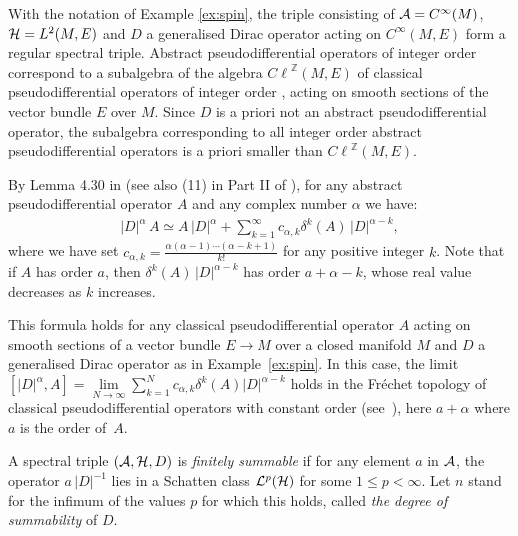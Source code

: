 \documentclass[11pt]{article}
\def \Z {\mathbb Z}
\def \Ci {{C^\infty}}
\def \Cl {{C\ell}}
\numberwithin{equation}{section}
\begin{document}
\begin{example} With the notation  of Example \ref{ex:spin}, the triple consisting of  ${\cal A}=\Ci(M)$,
  ${\cal H}= L^2(M, E)$ and $D$ a generalised Dirac operator acting on $\Ci(M,
  E)$ form a regular spectral triple. Abstract pseudodif\/ferential operators
 of integer order correspond to a subalgebra of the algebra $\Cl^\Z(M, E)$ of classical pseudodif\/ferential operators of integer
  order \cite{Ho, Sh,Ta,Tr}, acting on smooth sections of the vector bundle $E$ over $M$. Since
   $D$ is a priori not an abstract pseudo\-dif\/ferential operator, the subalgebra
  corresponding to all integer order abstract pseudodif\/ferential operators is a
  priori smaller than  $\Cl^\Z(M, E)$.
\end{example}

By Lemma
4.30 in \cite{Hig} (see also (11) in Part II of \cite{CoMo}), for any abstract
pseudodif\/ferential operator $A$ and any complex number $\alpha$  we have:
 \begin{gather} \label{eq:commDalpha} \vert D\vert^\alpha\,  A\simeq    A\,
 \vert D\vert^\alpha+  \sum_{k=1}^\infty c_{\alpha,k}
\delta^k(A) \, \vert D\vert^{\alpha -k},
\end{gather}
 where we have set $c_{ \alpha, k}=
 \frac{\alpha(\alpha-1)\cdots (\alpha-k+1)}{k!}$ for any positive integer $k$. Note that if $A$ has order
$a$,
 then  $\delta^k(A)\, \vert D\vert^{\alpha-k}$ has order $a+\alpha-k$,   whose
 real value  decreases as $k$ increases.
\begin{example}
This formula holds  for any classical pseudodif\/ferential
operator $A$ acting on smooth sections of a vector bundle $E\to M$ over a
closed manifold $M$  and $D$ a generalised Dirac operator as in Example~\ref{ex:spin}. In this case,   the
limit $[\vert D\vert^\alpha, A]= \lim\limits_{N\to \infty}  \sum\limits_{k=1}^N c_{\alpha,k}
\delta^k(A)   \vert D\vert^{\alpha -k}$  holds in the Fr\'echet topology  of
classical pseudodif\/ferential operators with constant order (see~\cite{KV}),
 here $a+\alpha$ where $a$ is the order of~$A$.
\end{example}

\begin{definition} A  spectral triple $\left({\cal A}, {\cal H}, D\right)$ is   {\it
    finitely summable}   if  for any element $ a$ in
${\cal A}$, the operator $a\, \vert D\vert^{-1}$ lies in  a  Schatten class ${\cal
  L}^p({\cal H})$ for some $1\leq p<\infty$. Let $n$ stand for the inf\/imum of
the values  $p$ for which this holds, called {\it the degree of summability}
of $D$.
\end{definition}
\end{document}
